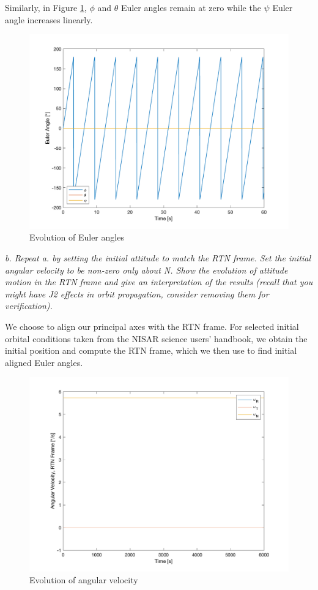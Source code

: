 Similarly, in Figure \ref{fig:ps4_problem1a_angle}, $\phi$ and $\theta$ Euler angles remain at zero while the $\psi$ Euler angle increases linearly.

\begin{figure}[H]
\centering
\includegraphics[scale=0.6]{Images/ps4_problem1a_angle.png}
\caption{Evolution of Euler angles}
\label{fig:ps4_problem1a_angle}
\end{figure}

\textit{b. Repeat a. by setting the initial attitude to match the RTN frame. Set the initial angular velocity to be non-zero only about N. Show the evolution of attitude motion in the RTN frame and give an interpretation of the results (recall that you might have J2 effects in orbit propagation, consider removing them for verification).}

We choose to align our principal axes with the RTN frame. For selected initial orbital conditions taken from the NISAR science users' handbook, we obtain the initial position and compute the RTN frame, which we then use to find initial aligned Euler angles.

\begin{figure}[H]
\centering
\includegraphics[scale=0.6]{Images/ps4_problem1b_angvel.png}
\caption{Evolution of angular velocity}
\label{fig:ps4_problem1b_angvel}
\end{figure}

